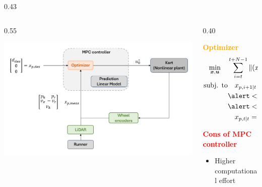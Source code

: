 \documentclass[9pt, aspectratio=169]{beamer}
\begin{document}
\begin{frame}
\begin{columns}
\begin{column}{0.43\textwidth}
\begin{block}{}
\begin{itemize}
\end{itemize}
\end{block}
\end{column}

\end{columns}

\vspace{0.1cm}
\begin{columns}
\begin{column}{0.55\textwidth}
	\begin{center}
  		\includegraphics[width=1\textwidth]{MPC_scheme} 
	\end{center}
\end{column}

\begin{column}{0.40\textwidth}
\begin{block}{}
\centering
\textcolor{orange}{\textbf{Optimizer}} 
\begin{equation*}
\begin{alignedat}{2}
	\min_{\substack{\boldsymbol{x}, \boldsymbol{u}}}\quad &\sum_{i=t}^{t+N-1} \|(x_{p,i|t} - x_{p,\text{des}})\|_Q \, +  \|u_{i|t}\|_R &&   \\
	\text{subj. to} & \quad x_{p,i+1|t}  = A_p \, x_{p,i|t} + B_p \, u_{i|t} + a_t  && \\
    &\alert<3>{\quad a_{\text{min}} \leq u_{i|t} \leq a_{\text{max}}} && \\
    &\alert<4>{\quad d_{\text{safe}}\leq \Delta p_{i|t}} &&  \\
    &\quad x_{p,t|t} = x_{p,\text{meas}} &&
\end{alignedat}
\end{equation*}
\end{block}
\begin{block}{}
\centering
\textcolor{red}{\textbf{Cons of MPC controller}}
\begin{itemize}
\footnotesize
	\item[$\blacktriangleright$] Higher computational effort
\end{itemize}
\end{block}
\end{column}
\end{columns}
\end{frame}
\end{document}
